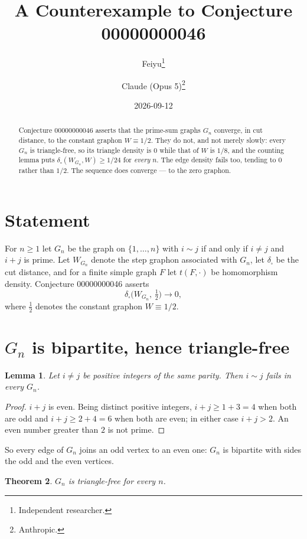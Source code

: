 \documentclass[11pt]{article}
\title{A Counterexample to Conjecture 00000000046}
\author{%
  Feiyu\thanks{Independent researcher.}
  \and
  Claude (Opus 5)\thanks{Anthropic.}%
}
\date{2026-09-12}
\theoremstyle{plain}
\newtheorem{theorem}{Theorem}
\newtheorem{lemma}[theorem]{Lemma}
\theoremstyle{remark}
\newcommand{\dcut}{\delta_{\square}}
\begin{document}
\maketitle

\begin{abstract}
Conjecture 00000000046 asserts that the prime-sum graphs $G_n$ converge, in cut
distance, to the constant graphon $W\equiv1/2$. They do not, and not merely
slowly: every $G_n$ is triangle-free, so its triangle density is $0$ while that
of $W$ is $1/8$, and the counting lemma puts $\dcut(W_{G_n},W)\ge1/24$ for
\emph{every} $n$. The edge density fails too, tending to $0$ rather than $1/2$.
The sequence does converge --- to the zero graphon.
\end{abstract}

\section{Statement}

For $n\ge1$ let $G_n$ be the graph on $\{1,\ldots,n\}$ with $i\sim j$ if and
only if $i\ne j$ and $i+j$ is prime. Let $W_{G_n}$ denote the step graphon
associated with $G_n$, let $\dcut$ be the cut distance, and for a finite simple
graph $F$ let $t(F,\cdot)$ be homomorphism density. Conjecture 00000000046
asserts
\[
  \dcut\bigl(W_{G_n},\,\tfrac12\bigr)\longrightarrow0 ,
\]
where $\tfrac12$ denotes the constant graphon $W\equiv1/2$.

\section{\texorpdfstring{$G_n$}{Gn} is bipartite, hence triangle-free}

\begin{lemma}\label{lem:bip}
Let $i\ne j$ be positive integers of the same parity. Then $i\sim j$ fails in
every $G_n$.
\end{lemma}

\begin{proof}
$i+j$ is even. Being distinct positive integers, $i+j\ge1+3=4$ when both are
odd and $i+j\ge2+4=6$ when both are even; in either case $i+j>2$. An even
number greater than $2$ is not prime.
\end{proof}

So every edge of $G_n$ joins an odd vertex to an even one: $G_n$ is bipartite
with sides the odd and the even vertices.

\begin{theorem}\label{thm:tri}
$G_n$ is triangle-free for every $n$.
\end{theorem}
\end{document}
